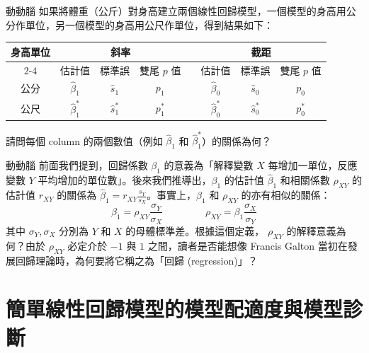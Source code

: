     \answerbox{330pt}
    
    \bigskip 

    \begin{custom}{動動腦}
       如果將體重（公斤）對身高建立兩個線性回歸模型，一個模型的身高用公分作單位，另一個模型的身高用公尺作單位，得到結果如下：

       \nopagebreak\medskip

       \begin{tabular}{cccccccc}
            \toprule
            \multirow{2}{*}{身高單位} & \multicolumn{3}{c}{斜率} && \multicolumn{3}{c}{截距} \\
            \cline{2-4}\cline{6-8}
            & 估計值 & 標準誤 & 雙尾 $p$ 值 && 估計值 & 標準誤 & 雙尾 $p$ 值\\
            \hline
            公分 & $\hat{\beta}_1$ & $\hat{s}_1$ & $p_1$ && $\hat{\beta}_0$ & $\hat{s}_0$ & $p_0$ \\  
            公尺 & $\hat{\beta}_1^*$ & $\hat{s}_1^*$ & $p_1^*$ && $\hat{\beta}_0^*$ & $\hat{s}_0^*$ & $p_0^*$ \\
            \bottomrule
       \end{tabular}

       \nopagebreak\medskip

       \noindent 請問每個 column 的兩個數值（例如 $\hat{\beta}_1$ 和 $\hat{\beta}_1^*$）的關係為何？
    \end{custom}

    \answerbox{195pt}
    
    \bigskip 

    \begin{custom}{動動腦}
       前面我們提到，回歸係數 $\beta_1$ 的意義為「解釋變數 $X$ 每增加一單位，反應變數 $Y$ 平均增加的單位數」。後來我們推導出，$\beta_1$ 的估計值 $\hat{\beta}_1$ 和相關係數 $\rho_{XY}$ 的估計值 $r_{XY}$ 的關係為 $\hat{\beta}_1 = r_{XY} \frac{s_Y}{s_X}$。事實上，$\beta_1$ 和 $\rho_{XY}$ 的亦有相似的關係：
       \[\beta_1 = \rho_{XY} \frac{\sigma_Y}{\sigma_X} \qquad \; \qquad \rho_{XY} = \beta_1 \frac{\sigma_X}{\sigma_Y}\]
       其中 $\sigma_Y, \sigma_X$ 分別為 $Y$ 和 $X$ 的母體標準差。根據這個定義， $\rho_{XY}$ 的解釋意義為何？由於 $\rho_{XY}$ 必定介於 $-1$ 與 $1$ 之間，讀者是否能想像 Francis Galton 當初在發展回歸理論時，為何要將它稱之為「回歸 (regression)」？
    \end{custom}

    \answerbox{195pt}
    
    \bigskip
    
    \section{簡單線性回歸模型的模型配適度與模型診斷}

